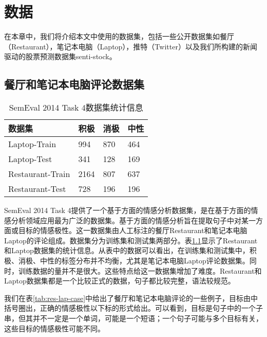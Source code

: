\chapter{数据}
\label{cha:data}
在本章中，我们将介绍本文中使用的数据集，包括一些公开数据集如餐厅（Restaurant），笔记本电脑（Laptop），推特（Twitter）以及我们所构建的新闻驱动的股票预测数据集senti-stock。
\section{餐厅和笔记本电脑评论数据集}

\begin{table}[htb]
	\centering
	\begin{minipage}[t]{0.5\linewidth} %
		\caption[SemEval 2014 Task 4数据集统计信息]{SemEval 2014 Task 4数据集统计信息}
		\label{tab:stat}
		\begin{tabularx}{\linewidth}{Xlll}
			\toprule[1.5pt]
			{\heiti 数据集} & {\heiti 积极} & {\heiti 消极} & {\heiti 中性} \\\midrule[1pt]
			Laptop-Train &  994 & 870 & 464\\
			Laptop-Test & 341 & 128 & 169\\
			Restaurant-Train & 2164 & 807 & 637\\
			Restaurant-Test & 728 & 196 & 196\\
			\bottomrule[1.5pt]
		\end{tabularx}
	\end{minipage}
\end{table}

SemEval 2014 Task 4提供了一个基于方面的情感分析数据集，是在基于方面的情感分析领域应用最为广泛的数据集。基于方面的情感分析旨在提取句子中对某一方面或目标的情感极性。这一数据集由人工标注的餐厅Restaurant和笔记本电脑Laptop的评论组成。数据集分为训练集和测试集两部分。表\ref{tab:stat}显示了Restaurant和Laptop数据集的统计信息。从表中的数据可以看出，在训练集和测试集中，积极、消极、中性的标签分布并不均衡，尤其是笔记本电脑Laptop评论数据集。同时，训练数据的量并不是很大。这些特点给这一数据集增加了难度。Restaurant和Laptop数据集都是一个比较正式的数据，句子都比较完整，语法较规范。

我们在表\ref{tab:res-lap-case}中给出了餐厅和笔记本电脑评论的一些例子，目标由中括号圈出，正确的情感极性以下标的形式给出。可以看到，目标是句子中的一个子串，但其并不一定是一个单词，可能是一个短语；一个句子可能与多个目标有关，这些目标的情感极性可能不同。

